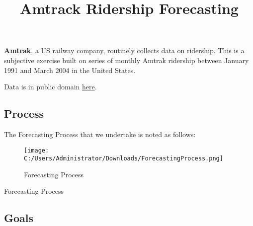 \documentclass[]{article}
\title{Amtrack Ridership Forecasting}
\author{}
\date{}
\begin{document}
\maketitle

\textbf{Amtrak}, a US railway company, routinely collects data on
ridership. This is a subjective exercise built on series of monthly
Amtrak ridership between January 1991 and March 2004 in the United
States.

Data is in public domain
\href{https://docs.google.com/open?id=0B76mgCvz1US5Z1lGRkZQZ1pRLTQ}{here}.

\subsection{Process}\label{process}

The Forecasting Process that we undertake is noted as follows:

\begin{figure}
\centering
\texttt{[image: C:/Users/Administrator/Downloads/ForecastingProcess.png]}
\caption{Forecasting Process}
\end{figure}

Forecasting Process

\subsection{Goals}\label{goals}
\end{document}
